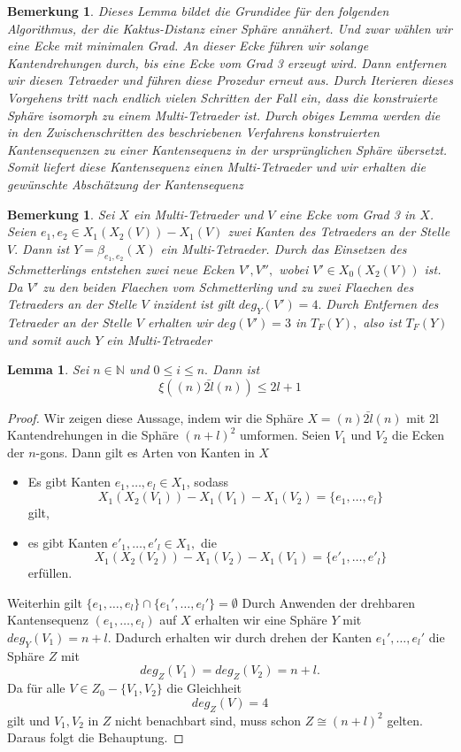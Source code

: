 \documentclass[12pt,titlepage,twoside,cleardoublepage]{article}
\theoremstyle{nummermitklammern}
\newtheorem{lemma}[temp]{Lemma}
\newtheorem{bemerkung}[temp]{Bemerkung}
\newtheorem{lemma}[zahl]{Lemma}
\newtheorem{bemerkung}[zahl]{Bemerkung}
\numberwithin{equation}{section}
\begin{document}
\begin{bemerkung}
Dieses Lemma bildet die Grundidee für den folgenden Algorithmus, der die Kaktus-Distanz einer Sphäre annähert. Und zwar wählen wir eine Ecke mit minimalen Grad. An dieser Ecke führen wir solange Kantendrehungen durch, bis eine Ecke vom Grad 3 erzeugt wird. Dann entfernen wir diesen Tetraeder und führen diese Prozedur erneut aus. Durch Iterieren dieses Vorgehens tritt nach endlich vielen Schritten der Fall ein, dass die konstruierte Sphäre isomorph zu einem Multi-Tetraeder ist. Durch obiges Lemma werden die in den Zwischenschritten des beschriebenen Verfahrens konstruierten Kantensequenzen zu einer Kantensequenz in der ursprünglichen Sphäre übersetzt. Somit liefert diese Kantensequenz einen Multi-Tetraeder und wir erhalten die gewünschte Abschätzung der Kantensequenz
\end{bemerkung}
\begin{bemerkung}
Sei $X$ ein Multi-Tetraeder und $V$ eine Ecke vom Grad 3 in $X$. Seien $e_1,e_2\in X_1(X_2(V))-X_1(V)$ zwei Kanten des Tetraeders an der Stelle $V.$ Dann ist $Y=\beta_{e_1,e_2}(X)$ ein Multi-Tetraeder. Durch das Einsetzen des Schmetterlings entstehen zwei neue Ecken $V',V'',$ wobei $V'\in X_0(X_2(V))$ ist. Da $V'$ zu den beiden Flaechen vom Schmetterling und zu zwei Flaechen des Tetraeders an der Stelle $V$ inzident ist gilt $deg_Y(V')=4.$ Durch Entfernen des Tetraeder an der Stelle $V$ erhalten wir $deg(V')=3$ in $T_F(Y), $ also ist $T_F(Y) $ und somit auch $Y$ ein Multi-Tetraeder   
\end{bemerkung}
\begin{lemma}
Sei $n\in \mathbb{N}$ und $0\leq i \leq n.$ Dann ist 
\[
\xi((n)\bar{2l}(n))\leq 2l+1
\]
\end{lemma}
\begin{proof}
Wir zeigen diese Aussage, indem wir die Sphäre $X=(n)\bar{2l}(n)$ mit 2l Kantendrehungen in die Sphäre $(n+l)^2$ umformen. Seien $V_1$ und $V_2$ die Ecken der $n$-gons. Dann gilt es Arten von Kanten in $X$
\begin{itemize}
\item Es gibt Kanten $e_1,\ldots, e_l\in X_1$, sodass 
\[
X_1(X_2(V_1))-X_1(V_1)-X_1(V_2)=\{e_1,\ldots,e_l\}
\] gilt,
\item es gibt Kanten $e'_1,\ldots,e'_l\in X_1, $ die
\[
X_1(X_2(V_2))-X_1(V_2)-X_1(V_1)=\{e'_1,\ldots,e'_l\}
\] erfüllen.
\end{itemize}
Weiterhin gilt $\{e_1,\ldots,e_l\}\cap\{e_1',\ldots,e_l'\}=\emptyset$
Durch Anwenden der drehbaren Kantensequenz $(e_1,\ldots,e_l)$ auf $X$ erhalten wir eine Sphäre $Y$ mit $deg_Y(V_1)=n+l.$ Dadurch erhalten wir durch drehen der Kanten $e_1',\ldots,e_l'$ die Sphäre $Z$ mit 
\[
deg_Z(V_1)=deg_Z(V_2)=n+l.
\]
Da für alle $V\in Z_0-\{V_1,V_2\}$ die Gleichheit 
\[
deg_Z(V)=4
\]
gilt und $V_1,V_2$ in $Z$ nicht benachbart sind, muss schon $Z\cong (n+l)^2$ gelten. Daraus folgt die Behauptung.
\end{proof}
\end{document}
